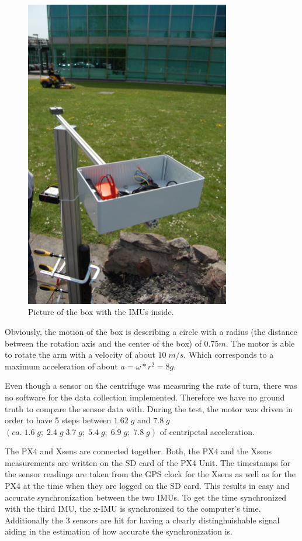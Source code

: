 \begin{figure}[hb]
\begin{center}
\includegraphics[width=0.8\textwidth]{pictures/box.JPG}
\caption{Picture of the box with the IMUs inside.}
\label{box}
\end{center}
\end{figure}
Obviously, the motion of the box is describing a circle with a radius (the distance between the rotation axis and the  center of the box) of $0.75 m$. The motor is able to rotate the arm with a velocity of about $10\; m/s$. Which corresponds to a maximum acceleration of about $ a=\omega*r^2=8 g$. 

Even though a sensor on the centrifuge was measuring the rate of turn, there was no software for the data collection implemented. Therefore we have no ground truth to compare the sensor data with. 
During the test, the motor was driven in order to have 5 steps between $1.62\;g$ and $7.8\;g$ $(ca.\;1.6\;g;\;2.4\;g\;3.7\;g;\;5.4\;g;\;6.9\;g;\;7.8\;g)$ of centripetal acceleration.

The PX4 and Xsens are connected together. Both, the PX4 and the Xsens measurements are written on the SD card of the PX4 Unit. The timestamps for the sensor readings are taken from the GPS clock for the Xsens as well as for the PX4 at the time when they are logged on the SD card. This results in easy and accurate synchronization between the two IMUs. To get the time synchronized with the third IMU, the x-IMU is synchronized to the computer's time. Additionally the 3 sensors are hit for having a clearly distinghuishable signal aiding in the estimation of how accurate the synchronization is.

